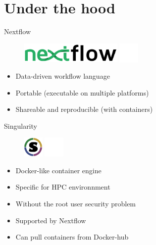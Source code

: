 \documentclass[usepdftitle=false]{beamer}
\begin{document}

\section{Under the hood}

\begin{frame}{Nextflow}
	\begin{figure}
		\includegraphics[height=1cm]{pictures/nextflow.png}
		\includegraphics[height=1cm]{pictures/blank}
	\end{figure}
	\begin{itemize}
		\item Data-driven workflow language
		\pause
		\item Portable (executable on multiple platforms)
		\pause
		\item Shareable and reproducible (with containers)
	\end{itemize}
	\vfill
\end{frame}


\begin{frame}{Singularity}
	\begin{figure}
		\includegraphics[height=1cm]{pictures/Singularity_logo}
		\includegraphics[height=1cm]{pictures/blank}
	\end{figure}
	\begin{itemize}
		\item Docker-like container engine
		\item Specific for HPC environnment
		\pause
		\item Without the root user security problem
		\pause
		\item Supported by Nextflow
		\pause
		\item Can pull containers from Docker-hub
	\end{itemize}
\end{frame}
\end{document}
